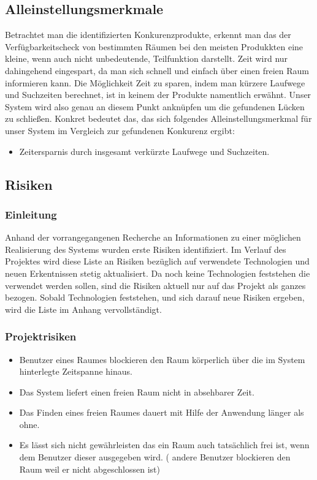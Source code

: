 \subsection{Alleinstellungsmerkmale}
\label{sec:Alleinstellungsmerkmale}

Betrachtet man die identifizierten Konkurenzprodukte, erkennt man das der
Verfügbarkeitscheck von bestimmten Räumen bei den meisten Produkkten eine
kleine, wenn auch nicht unbedeutende, Teilfunktion darstellt. Zeit wird nur
dahingehend eingespart, da man sich schnell und einfach über einen freien Raum
informieren kann. Die Möglichkeit Zeit zu sparen, indem man kürzere Laufwege
und Suchzeiten berechnet, ist in keinem der Produkte namentlich erwähnt.
Unser System wird also genau an diesem Punkt anknüpfen um die gefundenen Lücken
zu schließen. Konkret bedeutet das, das sich folgendes Alleinstellungsmerkmal
für unser System im Vergleich zur gefundenen Konkurenz ergibt:

\begin{itemize}
	\item Zeitersparnis durch insgesamt verkürzte Laufwege und Suchzeiten.
\end{itemize}


\subsection{Risiken}
\label{sec:Risiken}

\subsubsection{Einleitung}
\label{sec:Risiken_Einleitung}

Anhand der vorrangegangenen Recherche an Informationen zu einer möglichen
Realisierung des Systems wurden erste Risiken identifiziert. Im Verlauf des
Projektes wird diese Liste an Risiken bezüglich auf verwendete Technologien
und neuen Erkentnissen stetig aktualisiert. Da noch keine Technologien
feststehen die verwendet werden sollen, sind die Risiken aktuell nur auf das
Projekt als ganzes bezogen. Sobald Technologien feststehen, und sich darauf
neue Risiken ergeben, wird die Liste im Anhang vervollständigt.

\subsubsection{Projektrisiken}
\label{sec:Projektrisiken}

\begin{itemize}
	\item Benutzer eines Raumes blockieren den Raum körperlich über die im System hinterlegte Zeitspanne hinaus.
	\item Das System liefert einen freien Raum nicht in absehbarer Zeit.
	\item Das Finden eines freien Raumes dauert mit Hilfe der Anwendung länger als ohne.
	\item Es lässt sich nicht gewährleisten das ein Raum auch tatsächlich frei ist, wenn dem Benutzer
	dieser ausgegeben wird. ( andere Benutzer blockieren den Raum \zB weil er nicht abgeschlossen ist)
\end{itemize}
